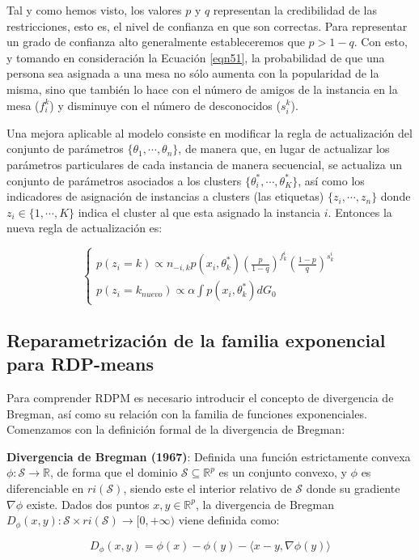 Tal y como hemos visto, los valores $p$ y $q$ representan la credibilidad de las restricciones, esto es, el nivel de confianza en que son correctas. Para representar un grado de confianza alto generalmente estableceremos que $p > 1 - q$. Con esto, y tomando en consideración la Ecuación \ref{eqn51}, la probabilidad de que una persona sea asignada a una mesa no sólo aumenta con la popularidad de la misma, sino que también lo hace con el número de amigos de la instancia en la mesa ($f_{i}^k$) y disminuye con el número de desconocidos ($s_{i}^k$).

Una mejora aplicable al modelo consiste en modificar la regla de actualización del conjunto de parámetros $ \{\theta_1, \cdots, \theta_n\}$, de manera que, en lugar de actualizar los parámetros particulares de cada instancia de manera secuencial, se actualiza un conjunto de parámetros asociados a los clusters $\{\theta_i^*, \cdots, \theta_K^*\}$, así como los indicadores de asignación de instancias a clusters (las etiquetas) $\{z_i, \cdots, z_n\}$ donde $z_i\in \{1, \cdots, K\}$ indica el cluster al que esta asignado la instancia $i$. Entonces la nueva regla de actualización es:

\begin{equation}
\begin{cases}
p(z_i = k) \varpropto n_{-i,k}p(x_i,\theta_k^*)\left(\frac{p}{1-q}\right)^{f_{k}^i} \left(\frac{1-p}{q}\right)^{s_{k}^i} \\
p(z_i = k_{nuevo}) \varpropto \alpha \int p(x_i,\theta_k^*)dG_0
\end{cases}
\label{eqn53}
\end{equation}

\subsection{Reparametrización de la familia exponencial para RDP-means}

Para comprender \acf{RDPM} es necesario introducir el concepto de divergencia de Bregman, así como su relación con la familia de funciones exponenciales. Comenzamos con la definición formal de la divergencia de Bregman:

\begin{definicion}
	
	\textbf{Divergencia de Bregman (1967)}: Definida una función estrictamente convexa $\phi: \mathcal{S} \rightarrow \mathbb{R}$, de forma que el dominio $\mathcal{S} \subseteq \mathbb{R}^p$ es un conjunto convexo, y $\phi$ es diferenciable en $ri(\mathcal{S})$, siendo este el interior relativo de $\mathcal{S}$ donde su gradiente $\nabla \phi$ existe. Dados dos puntos $x,y \in \mathbb{R}^p$, la divergencia de Bregman $D_{\phi}(x,y): \mathcal{S} \times ri(\mathcal{S}) \rightarrow [0, + \infty)$ viene definida como: \cite{RDPM:2015}
	
	$$ D_{\phi}(x,y) = \phi(x) - \phi(y) - \langle x - y, \nabla \phi(y)  \rangle $$
	
\end{definicion}

